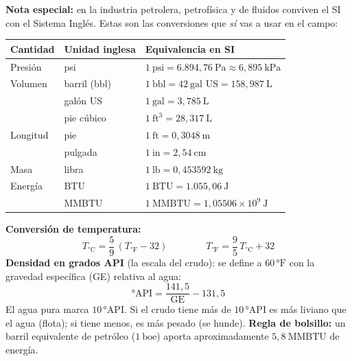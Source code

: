 \documentclass[12pt, letterpaper]{article}
\begin{document}
\begin{cuadroextra}
  \small
  \textbf{Nota especial:} en la industria petrolera, petrofísica y de fluidos conviven el SI con el Sistema Inglés. Estas son las conversiones que \emph{sí} vas a usar en el campo:
  \begin{center}
    \begin{tabular}{lll}
      \toprule
      \textbf{Cantidad} & \textbf{Unidad inglesa} & \textbf{Equivalencia en SI} \\
      \midrule
      Presión   & psi  & $1\ \text{psi} = 6.894{,}76\ \text{Pa} \approx 6{,}895\ \text{kPa}$ \\
      Volumen   & barril (bbl) & $1\ \text{bbl} = 42\ \text{gal US} = 158{,}987\ \text{L}$ \\
                & galón US & $1\ \text{gal} = 3{,}785\ \text{L}$                          \\
                & pie cúbico & $1\ \text{ft}^{3} = 28{,}317\ \text{L}$                    \\
      Longitud  & pie   & $1\ \text{ft} = 0{,}3048\ \text{m}$                          \\
                & pulgada & $1\ \text{in} = 2{,}54\ \text{cm}$                          \\
      Masa      & libra & $1\ \text{lb} = 0{,}453592\ \text{kg}$                       \\
      Energía   & BTU   & $1\ \text{BTU} = 1.055{,}06\ \text{J}$                       \\
                & MMBTU & $1\ \text{MMBTU} = 1{,}05506 \times 10^{9}\ \text{J}$        \\
      \bottomrule
    \end{tabular}
  \end{center}
  \textbf{Conversión de temperatura:}
  \[
    T_{°\text{C}} = \frac{5}{9}\,(T_{°\text{F}} - 32) \qquad\qquad
    T_{°\text{F}} = \frac{9}{5}\,T_{°\text{C}} + 32
  \]
  \textbf{Densidad en grados API} (la escala del crudo): se define a $60\,°\text{F}$ con la gravedad específica (GE) relativa al agua:
  \[
    °\text{API} = \frac{141{,}5}{\text{GE}} - 131{,}5
  \]
  El agua pura marca $10\,°\text{API}$. Si el crudo tiene más de $10\,°\text{API}$ es más liviano que el agua (flota); si tiene menos, es más pesado (se hunde). \textbf{Regla de bolsillo:} un barril equivalente de petróleo ($1\ \text{boe}$) aporta aproximadamente $5{,}8\ \text{MMBTU}$ de energía.
\end{cuadroextra}
\end{document}
